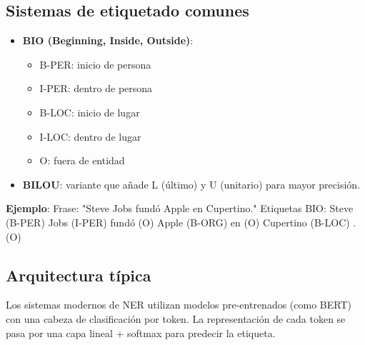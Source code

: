 \documentclass[12pt,a4paper,openany,oneside]{book}
\begin{document}
\subsection{Sistemas de etiquetado comunes}
\begin{itemize}
    \item \textbf{BIO (Beginning, Inside, Outside)}: 
    \begin{itemize}
        \item B-PER: inicio de persona
        \item I-PER: dentro de persona
        \item B-LOC: inicio de lugar
        \item I-LOC: dentro de lugar
        \item O: fuera de entidad
    \end{itemize}
    \item \textbf{BILOU}: variante que añade L (último) y U (unitario) para mayor precisión.
\end{itemize}

\textbf{Ejemplo}:
Frase: "Steve Jobs fundó Apple en Cupertino."
Etiquetas BIO: Steve (B-PER) Jobs (I-PER) fundó (O) Apple (B-ORG) en (O) Cupertino (B-LOC) . (O)

\subsection{Arquitectura típica}
Los sistemas modernos de NER utilizan modelos pre-entrenados (como BERT) con una cabeza de clasificación por token. La representación de cada token se pasa por una capa lineal + softmax para predecir la etiqueta.

\begin{center}
\caption{Etiquetado BIO en NER.}
\end{center}
\end{document}
